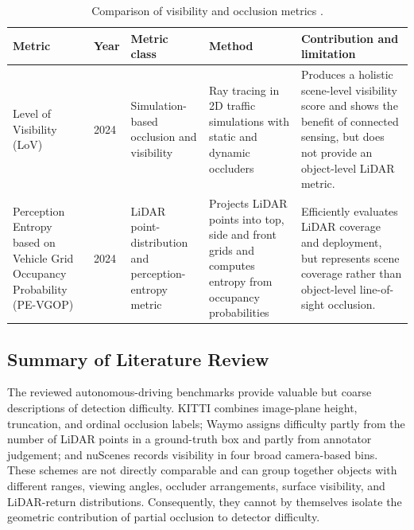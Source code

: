 \documentclass[12pt,a4paper]{article}
\begin{document}
\begin{table}[htbp]
    \centering
    \caption{Comparison of visibility and occlusion metrics \cite{bib_ref_9,bib_ref_23}.}
    \label{tab:visibility-occlusion-metrics}
    \small
    \setlength{\tabcolsep}{3pt}
    \sloppy
    \renewcommand{\arraystretch}{1.15}
    \begin{tabularx}{\textwidth}{|p{2.5cm}|p{1.0cm}|p{2.8cm}|p{3.3cm}|Y|}
        \hline
        \textbf{Metric} & \textbf{Year} & \textbf{Metric class} & \textbf{Method} & \textbf{Contribution and limitation} \\
        \hline
        Level of Visibility (LoV) & 2024 & Simulation-based occlusion and visibility & Ray tracing in 2D traffic simulations with static and dynamic occluders & Produces a holistic scene-level visibility score and shows the benefit of connected sensing, but does not provide an object-level LiDAR metric. \\
        \hline
        Perception Entropy based on Vehicle Grid Occupancy Probability (PE-VGOP) & 2024 & LiDAR point-distribution and perception-entropy metric & Projects LiDAR points into top, side and front grids and computes entropy from occupancy probabilities & Efficiently evaluates LiDAR coverage and deployment, but represents scene coverage rather than object-level line-of-sight occlusion. \\
        \hline
    \end{tabularx}
\end{table}

\subsection{Summary of Literature Review}

The reviewed autonomous-driving benchmarks provide valuable but coarse descriptions of detection difficulty. KITTI combines image-plane height, truncation, and ordinal occlusion labels; Waymo assigns difficulty partly from the number of LiDAR points in a ground-truth box and partly from annotator judgement; and nuScenes records visibility in four broad camera-based bins. These schemes are not directly comparable and can group together objects with different ranges, viewing angles, occluder arrangements, surface visibility, and LiDAR-return distributions. Consequently, they cannot by themselves isolate the geometric contribution of partial occlusion to detector difficulty.
\end{document}
